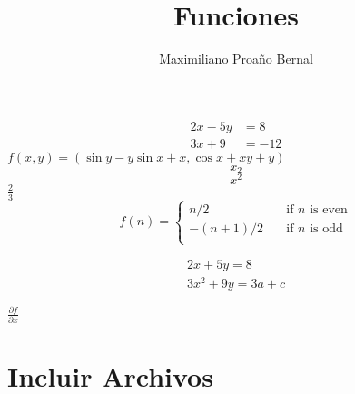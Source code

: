 \documentclass[]{article}
\title{Funciones}
\author{Maximiliano Proaño Bernal}
\begin{document}
\maketitle
	\begin{align*}
	2x - 5y &= 8\\
	3x + 9 &= -12
	\end{align*}
$f(x,y)= (\sin y - y \sin x +x, \cos x + x y + y)$
\[x_{2}\] \[x^{2}\]
$\frac{2}{3}$
\[f(n)=\left\{\begin{array}{ll}n/2 & \quad \mbox{if $n$ is even}\\-(n+1)/2 & \quad \mbox{if $n$ is odd}\\\end{array}\right.\]

\begin{gather*}
2x + 5y = 8\\
3x^2 + 9y = 3a +c
\end{gather*}

\begin{flushleft} %
	$\frac{\partial f}{\partial x}$
\end{flushleft}

\section*{Incluir Archivos}

\end{document}
